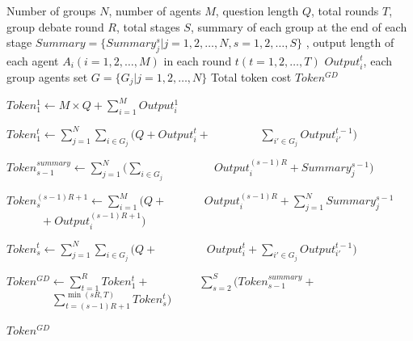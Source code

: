 \begin{algorithm}[ht]
    \caption{Tokens Cost in GroupDebate Methods}
    \label{alg:token_cost_gd}
    \begin{algorithmic}[1]
        \Require Number of groups $N$, number of agents  $M$, question length $Q$, total rounds $T$, group debate round $R$, total stages $S$, summary of each group at the end of each stage $Summary = \{Summary_j^s|j=1,2, \ldots,N,s=1,2,\ldots,S\}$ , output length of each agent $A_i(i=1,2, \ldots,M)$ in each round $t(t=1,2,\ldots,T)$ $Output_i^t$,  each group agents set $G = \{G_j|j=1,2, \ldots,N\}$
        \Ensure Total token cost $Token^{GD}$
        
        \State $Token_1^{1} \gets M \times Q + \sum_{i=1}^{M} Output_i^1$ 
        \Statex {} 
        
            \State $Token_1^t \gets \sum_{j=1}^{N} \sum_{i \in G_j} (Q  + Output_i^{t}+$
            \Statex $\qquad \qquad \sum_{i' \in G_j} Output_{i'}^{t-1})$ 
            \Statex {}
        \EndFor
        
            \State $Token_{s-1}^{summary} \gets \sum_{j=1}^{N} (\sum_{i \in G_j}$
            \Statex $\qquad \qquad Output_i^{(s-1)R} + Summary_j^{s-1})$ 
            \Statex {}
        
            \State $Token_s^{(s-1)R+1} \gets \sum_{i=1}^{M} (Q+$
            \Statex $\qquad \quad Output_i^{(s-1)R}+ \sum_{j=1}^{N} Summary_j^{s-1}$
            \Statex $\qquad \quad + Output_i^{(s-1)R+1})$ 
            \Statex {}
        
                \State $Token_s^t \gets \sum_{j=1}^{N} \sum_{i \in G_j} (Q  + $
                \Statex $\qquad \qquad Output_i^{t} + \sum_{i' \in G_j} Output_{i'}^{t-1})$ 
                \Statex {}
            \EndFor
        \EndFor
        
        \State $Token^{GD} \gets  \sum_{t=1}^{R}Token_1^t+$
        \Statex $\qquad \qquad \sum_{s=2}^S(Token_{s-1}^{summary}+$
        \Statex $\qquad \qquad \sum_{t=(s-1)R+1}^{\min(sR,T)}Token_s^t)$ 
        \Statex {}
        
        \State \Return $Token^{GD}$
    \end{algorithmic}
\end{algorithm}

